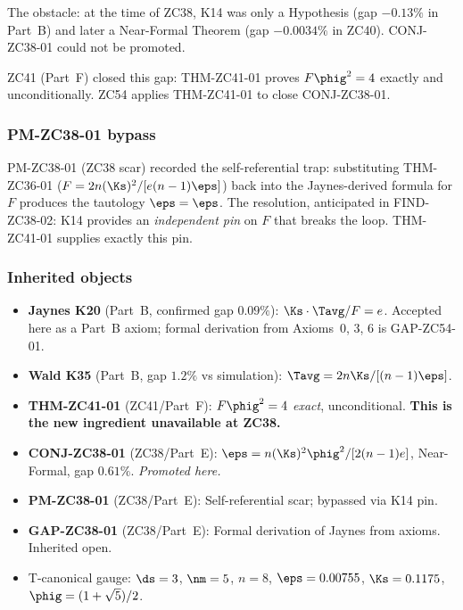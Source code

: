 \documentclass[12pt, a4paper]{article}
\begin{document}
The obstacle: at the time of ZC38, K14 was only a Hypothesis
(gap $-0.13\%$ in Part~B) and later a Near-Formal Theorem
(gap $-0.0034\%$ in ZC40). CONJ-ZC38-01 could not be promoted.

ZC41 (Part~F) closed this gap: THM-ZC41-01 proves
$F\phig^2 = 4$ exactly and unconditionally.
ZC54 applies THM-ZC41-01 to close CONJ-ZC38-01.

\subsubsection{PM-ZC38-01 bypass}

PM-ZC38-01 (ZC38 scar) recorded the self-referential trap:
substituting THM-ZC36-01 ($F = 2n(\Ks)^2/[e(n-1)\eps]$) back
into the Jaynes-derived formula for $F$ produces
the tautology $\eps = \eps$.
The resolution, anticipated in FIND-ZC38-02: K14 provides an
\emph{independent pin} on $F$ that breaks the loop.
THM-ZC41-01 supplies exactly this pin.

\subsubsection{Inherited objects}

\begin{itemize}[leftmargin=2em, noitemsep]
\item \textbf{Jaynes K20} (Part~B, confirmed gap $0.09\%$):
  $\Ks\cdot\Tavg/F = e$.
  Accepted here as a Part~B axiom; formal derivation from
  Axioms~0, 3, 6 is GAP-ZC54-01.
\item \textbf{Wald K35} (Part~B, gap $1.2\%$ vs simulation):
  $\Tavg = 2n\Ks/[(n-1)\eps]$.
\item \textbf{THM-ZC41-01} (ZC41/Part~F):
  $F\phig^2 = 4$ \emph{exact}, unconditional.
  \textbf{This is the new ingredient unavailable at ZC38.}
\item \textbf{CONJ-ZC38-01} (ZC38/Part~E):
  $\eps = n(\Ks)^2\phig^2/[2(n-1)e]$, Near-Formal,
  gap $0.61\%$. \emph{Promoted here.}
\item \textbf{PM-ZC38-01} (ZC38/Part~E):
  Self-referential scar; bypassed via K14 pin.
\item \textbf{GAP-ZC38-01} (ZC38/Part~E):
  Formal derivation of Jaynes from axioms. Inherited open.
\item T-canonical gauge: $\ds=3$, $\nm=5$, $n=8$,
  $\eps=0.00755$, $\Ks=0.1175$, $\phig=(1+\sqrt5)/2$.
\end{itemize}

\end{document}
